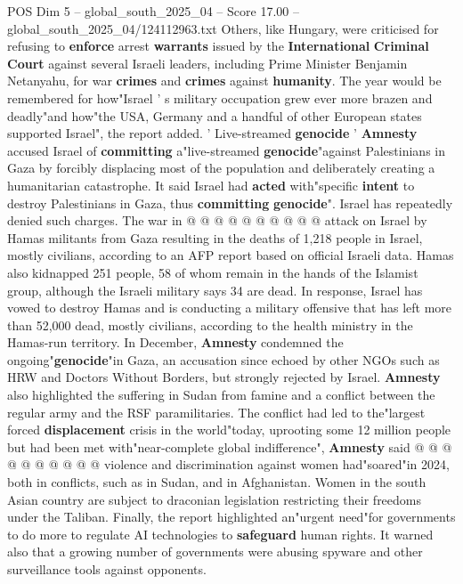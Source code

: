 \begin{textsample}{POS Dim 5 – global\_south\_2025\_04 – Score 17.00 – global\_south\_2025\_04/124112963.txt}
Others, like Hungary, were criticised for refusing to \textbf{enforce} arrest \textbf{warrants} issued by the \textbf{International} \textbf{Criminal} \textbf{Court} against several Israeli leaders, including Prime Minister Benjamin Netanyahu, for war \textbf{crimes} and \textbf{crimes} against \textbf{humanity}.
The year would be remembered for how"Israel ' s military occupation grew ever more brazen and deadly"and how"the USA, Germany and a handful of other European states supported Israel", the report added. ' Live-streamed \textbf{genocide} ' \textbf{Amnesty} accused Israel of \textbf{committing} a"live-streamed \textbf{genocide}"against Palestinians in Gaza by forcibly displacing most of the population and deliberately creating a humanitarian catastrophe.
It said Israel had \textbf{acted} with"specific \textbf{intent} to destroy Palestinians in Gaza, thus \textbf{committing} \textbf{genocide}".
Israel has repeatedly denied such charges.
The war in @ @ @ @ @ @ @ @ @ @ attack on Israel by Hamas militants from Gaza resulting in the deaths of 1,218 people in Israel, mostly civilians, according to an AFP report based on official Israeli data.
Hamas also kidnapped 251 people, 58 of whom remain in the hands of the Islamist group, although the Israeli military says 34 are dead.
In response, Israel has vowed to destroy Hamas and is conducting a military offensive that has left more than 52,000 dead, mostly civilians, according to the health ministry in the Hamas-run territory.
In December, \textbf{Amnesty} condemned the ongoing"\textbf{genocide}"in Gaza, an accusation since echoed by other NGOs such as HRW and Doctors Without Borders, but strongly rejected by Israel. \textbf{Amnesty} also highlighted the suffering in Sudan from famine and a conflict between the regular army and the RSF paramilitaries.
The conflict had led to the"largest forced \textbf{displacement} crisis in the world"today, uprooting some 12 million people but had been met with"near-complete global indifference", \textbf{Amnesty} said @ @ @ @ @ @ @ @ @ @ violence and discrimination against women had"soared"in 2024, both in conflicts, such as in Sudan, and in Afghanistan.
Women in the south Asian country are subject to draconian legislation restricting their freedoms under the Taliban.
Finally, the report highlighted an"urgent need"for governments to do more to regulate AI technologies to \textbf{safeguard} human rights.
It warned also that a growing number of governments were abusing spyware and other surveillance tools against opponents.

\end{textsample}
